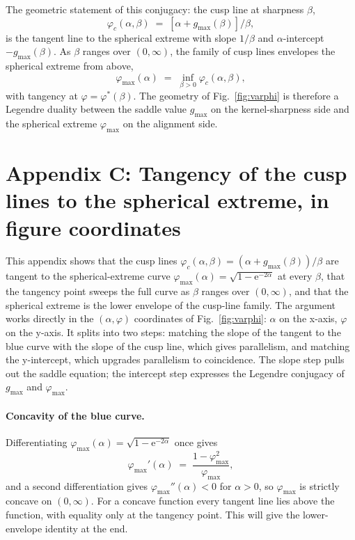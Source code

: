 \documentclass[letterpaper]{article} %
\newcommand{\e}{{\mathrm{e}}}
\newcommand{\Bnet}{\beta}
\begin{document}
The geometric statement of this conjugacy: the cusp line at sharpness $\Bnet$,
\begin{equation}
\varphi_c(\alpha, \Bnet) \;=\; [\alpha + g_{\max}(\Bnet)]/\Bnet,
\end{equation}
is the tangent line to the spherical extreme with slope $1/\Bnet$ and
$\alpha$-intercept $-g_{\max}(\Bnet)$. As $\Bnet$ ranges over $(0, \infty)$, the
family of cusp lines envelopes the spherical extreme from above,
\begin{equation}
\varphi_{\max}(\alpha) \;=\; \inf_{\Bnet > 0} \varphi_c(\alpha, \Bnet),
\end{equation}
with tangency at $\varphi = \varphi^*(\Bnet)$. The geometry of
Fig.~\ref{fig:varphi} is therefore a Legendre duality between the saddle value
$g_{\max}$ on the kernel-sharpness side and the spherical extreme $\varphi_{\max}$
on the alignment side.


\section{Appendix C: Tangency of the cusp lines to the spherical extreme, in figure coordinates}

This appendix shows that the cusp lines
$\varphi_c(\alpha, \Bnet) = (\alpha + g_{\max}(\Bnet))/\Bnet$ are tangent to the
spherical-extreme curve $\varphi_{\max}(\alpha) = \sqrt{1-\e^{-2\alpha}}$ at every
$\Bnet$, that the tangency point sweeps the full curve as $\Bnet$ ranges over
$(0, \infty)$, and that the spherical extreme is the lower envelope of the
cusp-line family. The argument works directly in the $(\alpha, \varphi)$
coordinates of Fig.~\ref{fig:varphi}: $\alpha$ on the x-axis, $\varphi$ on the
y-axis. It splits into two steps: matching the slope of the tangent to the blue
curve with the slope of the cusp line, which gives parallelism, and matching the
y-intercept, which upgrades parallelism to coincidence. The slope step pulls out
the saddle equation; the intercept step expresses the Legendre conjugacy of
$g_{\max}$ and $\varphi_{\max}$.

\paragraph{Concavity of the blue curve.}
Differentiating $\varphi_{\max}(\alpha) = \sqrt{1-\e^{-2\alpha}}$ once gives
\begin{equation}
\varphi_{\max}'(\alpha) \;=\; \frac{1-\varphi_{\max}^2}{\varphi_{\max}},
\label{eq:tangent_slope_C}
\end{equation}
and a second differentiation gives $\varphi_{\max}''(\alpha) < 0$ for $\alpha > 0$,
so $\varphi_{\max}$ is strictly concave on $(0, \infty)$. For a concave function
every tangent line lies above the function, with equality only at the tangency
point. This will give the lower-envelope identity at the end.
\end{document}

